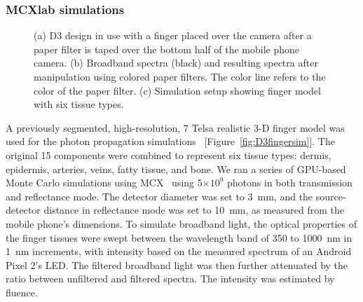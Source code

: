 \subsubsection{MCXlab simulations}
\begin{figure}
    \begin{center}
    \end{center}
    \caption{(a) D3 design in use with a finger placed over the camera after a paper filter is taped over the bottom half of the mobile phone camera. (b) Broadband spectra (black) and resulting spectra after manipulation using colored paper filters. The color line refers to the color of the paper filter. (c) Simulation setup showing finger model with six tissue types.} 
    \label{fig:D3simulations}
\end{figure} 
A previously segmented, high-resolution, 7 Telsa realistic 3-D finger model was used for the photon propagation simulations~\cite{Laistler2018} [Figure~\ref{fig:D3fingersim}]. The original 15 components were combined to represent six tissue types: dermis, epidermis, arteries, veins, fatty tissue, and bone. We ran a series of GPU-based Monte Carlo simulations using \ac{MCX}~\cite{Fang2009b} using 5$\times 10^9$ photons in both transmission and reflectance mode. The detector diameter was set to 3~mm, and the source-detector distance in reflectance mode was set to 10~mm, as measured from the mobile phone's dimensions. To simulate broadband light, the optical properties of the finger tissues were swept between the wavelength band of 350 to 1000~nm in 1~nm increments, with intensity based on the measured spectrum of an Android Pixel 2's \ac{LED}. The filtered broadband light was then further attenuated by the ratio between unfiltered and filtered spectra. The intensity was estimated by fluence.  
        
